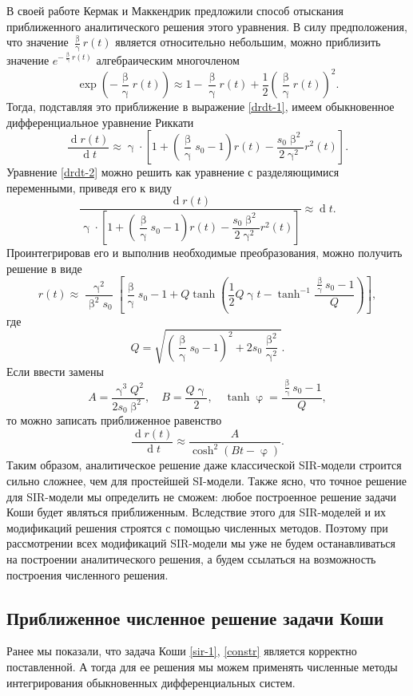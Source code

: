 \documentclass[a4paper, 14pt]{extreport}
\renewcommand{\beta}{\upbeta}
\renewcommand{\gamma}{\upgamma}
\renewcommand{\varphi}{\upvarphi}
\renewcommand{\d}{\operatorname{d}}
\begin{document}
	В своей работе Кермак и Маккендрик предложили способ отыскания приближенного аналитического решения этого уравнения. В силу предположения, что значение $\frac{\beta}{\gamma} r(t)$ является относительно небольшим, можно приблизить значение $e^{-\frac \beta \gamma r(t)}$ алгебраическим многочленом $$\exp\left(-\frac \beta \gamma r(t)\right) \approx 1 - \frac \beta \gamma r(t) + \dfrac12\left(\dfrac\beta\gamma r(t)\right)^2.$$
	Тогда, подставляя это приближение в выражение \eqref{drdt-1}, имеем обыкновенное дифференциальное уравнение Риккати 
	\begin{equation}
		\label{drdt-2}
		\dfrac{\d r(t)}{\d t} \approx \gamma\cdot \left[1 + \left(\dfrac\beta\gamma s_0 - 1\right)r(t) - \dfrac{s_0\beta ^2}{2 \gamma ^2}r^2(t)\right].
	\end{equation}
	Уравнение \eqref{drdt-2} можно решить как уравнение с разделяющимися переменными, приведя его к виду 
	$$\dfrac{\d r(t)}{\gamma\cdot \left[1 + \left(\dfrac\beta\gamma s_0 - 1\right)r(t) - \dfrac{s_0\beta ^2}{2 \gamma ^2}r^2(t)\right]} \approx \d t.$$
	Проинтегрировав его и выполнив необходимые преобразования, можно получить решение в виде
	\begin{equation}
		r(t)\approx \dfrac{\gamma^2}{\beta^2 s_0}\left[\dfrac{\beta}{\gamma}s_0 - 1 + Q \tanh \left(\dfrac 12Q \gamma t - \tanh^{-1}\dfrac{\frac \beta \gamma s_0 - 1}{Q} \right)\right],
	\end{equation}
	где $$Q = \sqrt{\left(\dfrac \beta \gamma s_0 - 1\right)^2 + 2s_0\dfrac{\beta^2}{\gamma^2}}.$$
	Если ввести замены $$A = \dfrac{\gamma^3 Q^2}{2 s_0 \beta^2},\quad B = \dfrac{Q \gamma }{2},\quad \tanh \varphi = \dfrac{\frac \beta \gamma s_0 - 1}Q,$$
	то можно записать приближенное равенство 
	\begin{equation}
		\dfrac{\d r(t)}{\d t} \approx \dfrac{A}{\cosh^2 (Bt - \varphi)}.
	\end{equation}
	Таким образом, аналитическое решение даже классической SIR-модели строится сильно сложнее, чем для простейшей SI-модели. Также ясно, что точное решение для SIR-модели мы определить не сможем: любое построенное решение задачи Коши будет являться приближенным. Вследствие этого для SIR-моделей и их модификаций решения строятся с помощью численных методов. Поэтому при рассмотрении всех модификаций SIR-модели мы уже не будем останавливаться на построении аналитического решения, а будем ссылаться на возможность построения численного решения.
	\subsection{Приближенное численное решение задачи Коши}
	Ранее мы показали, что задача Коши \eqref{sir-1}, \eqref{constr} является корректно поставленной. А тогда для ее решения мы можем применять численные методы интегрирования обыкновенных дифференциальных систем.
	
\end{document}
